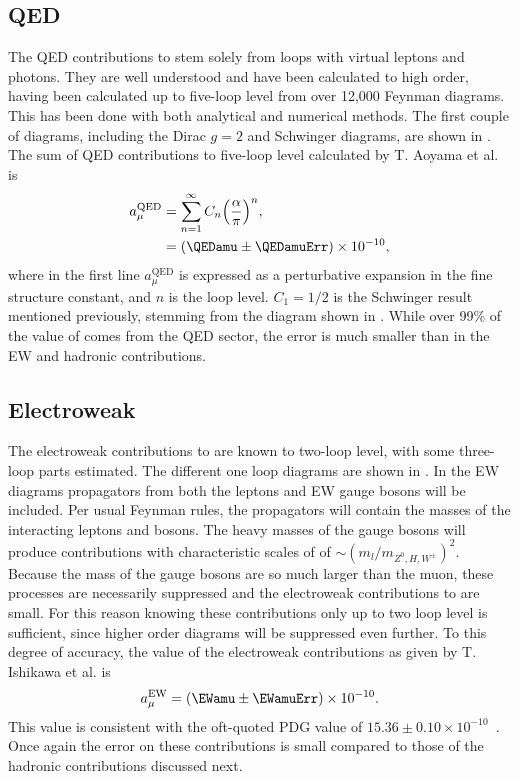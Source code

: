 \subsection{QED}
\label{subsec:QED}

The QED contributions to \amu stem solely from loops with virtual leptons and photons. They are well understood and have been calculated to high order, having been calculated up to five-loop level from over 12,000 Feynman diagrams. This has been done with both analytical and numerical methods. The first couple of diagrams, including the Dirac $g = 2$ and Schwinger diagrams, are shown in . The sum of QED contributions to five-loop level calculated by T. Aoyama et al. is~\cite{Kinoshita1,Kinoshita2}
		\begin{equation}
		\begin{aligned}
            a_{\mu}^{\text{QED}} &= \sum_{n=1}^{\infty} C_{n} \Big( \frac{\alpha}{\pi} \Big)^{n}, \\
            					 &= (\QEDamu \pm \QEDamuErr) \times 10^{-10},
		\end{aligned}
		\end{equation}
where in the first line $a_{\mu}^{\text{QED}}$ is expressed as a perturbative expansion in the fine structure constant, and $n$ is the loop level. $C_{1} = 1/2$ is the Schwinger result mentioned previously, stemming from the diagram shown in . While over 99\% of the value of \amu comes from the QED sector, the error is much smaller than in the EW and hadronic contributions.


\subsection{Electroweak}
\label{subsec:Electroweak}

The electroweak contributions to \amu are known to two-loop level, with some three-loop parts estimated. The different one loop diagrams are shown in . In the EW diagrams propagators from both the leptons and EW gauge bosons will be included. Per usual Feynman rules, the propagators will contain the masses of the interacting leptons and bosons. The heavy masses of the gauge bosons will produce contributions with characteristic scales of of $\sim(m_{l}/m_{Z^{0},H,W^{\pm}})^{2}$. Because the mass of the gauge bosons are so much larger than the muon, these processes are necessarily suppressed and the electroweak contributions to \amu are small. For this reason knowing these contributions only up to two loop level is sufficient, since higher order diagrams will be suppressed even further. To this degree of accuracy, the value of the electroweak contributions as given by T. Ishikawa et al. is~\cite{Ishikawa:2018rlv}
		\begin{align}
            a_{\mu}^{\text{EW}} = (\EWamu \pm \EWamuErr) \times 10^{-10}.
		\end{align}
This value is consistent with the oft-quoted PDG value of $15.36 \pm 0.10 \times 10^{-10}$~\cite{EW1}. Once again the error on these contributions is small compared to those of the hadronic contributions discussed next.


